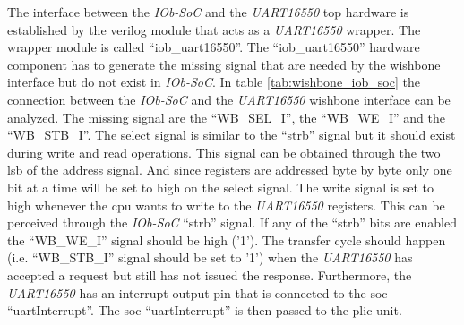 The interface between the \textit{IOb-SoC} and the \textit{UART16550} top hardware is established by the verilog module that acts as a \textit{UART16550} wrapper. The wrapper module is called \enquote{iob\_uart16550}. The \enquote{iob\_uart16550} hardware component has to generate the missing signal that are needed by the wishbone interface but do not exist in \textit{IOb-SoC}. In table \ref{tab:wishbone_iob_soc} the connection between the \textit{IOb-SoC} and the \textit{UART16550} wishbone interface can be analyzed. The missing signal are the \enquote{WB\_SEL\_I}, the \enquote{WB\_WE\_I} and the \enquote{WB\_STB\_I}. The select signal is similar to the \enquote{strb} signal but it should exist during write and read operations. This signal can be obtained through the two \acrfull{lsb} of the address signal. And since registers are addressed byte by byte only one bit at a time will be set to high on the select signal. The write signal is set to high whenever the \acrshort{cpu} wants to write to the \textit{UART16550} registers. This can be perceived through the \textit{IOb-SoC} \enquote{strb} signal. If any of the \enquote{strb} bits are enabled the \enquote{WB\_WE\_I} signal should be high ('1'). The transfer cycle should happen (i.e. \enquote{WB\_STB\_I} signal should be set to '1') when the \textit{UART16550} has accepted a request but still has not issued the response. Furthermore, the \textit{UART16550} has an interrupt output pin that is connected to the \acrshort{soc} \enquote{uartInterrupt}. The \acrshort{soc} \enquote{uartInterrupt} is then passed to the \acrshort{plic} unit.

